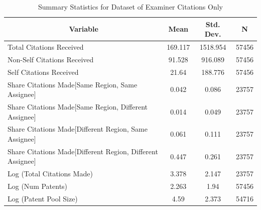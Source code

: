 \documentclass[12pt,letterpaper]{article}
\begin{document}
\begin{table}[htbp]\centering \caption{Summary Statistics for Dataset of Examiner Citations Only \label{e.sumstat}}
\scriptsize
\singlespacing
\begin{tabular}{l c c  c}\hline\hline
\multicolumn{1}{c}{\textbf{Variable}} & \textbf{Mean}
 & \textbf{Std. Dev.} & \textbf{N}\\ \hline
Total Citations Received & 169.117 & 1518.954  & 57456\\
Non-Self Citations Received& 91.528 & 916.089  & 57456\\
Self Citations Received& 21.64 & 188.776  & 57456\\
Share Citations Made[Same Region, Same Assignee] & 0.042 & 0.086  & 23757\\
Share Citations Made[Same Region, Different Assignee] & 0.014 & 0.049  & 23757\\
Share Citations Made[Different Region, Same Assignee] & 0.061 & 0.111  & 23757\\
Share Citations Made[Different Region, Different Assignee] & 0.447 & 0.261  & 23757\\
Log (Total Citations Made) & 3.378 & 2.147  & 23757\\
Log (Num Patents) & 2.263 & 1.94  & 57456\\
Log (Patent Pool Size) & 4.59 & 2.373  & 54716\\
\hline
\end{tabular}
\end{table}
\end{document}
